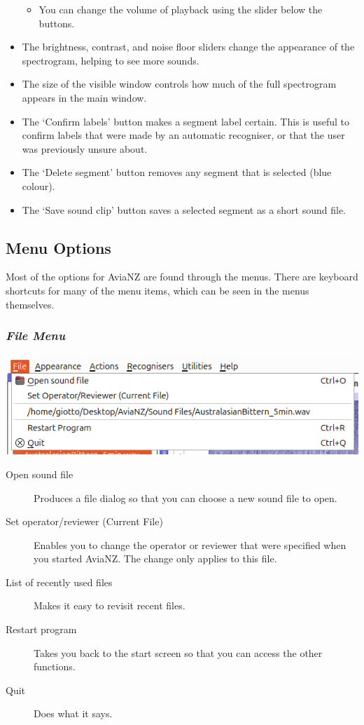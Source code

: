 \documentclass{article}
\begin{document}
\begin{itemize}
\begin{itemize}
\begin{itemize}
    \end{itemize}
\item You can change the volume of playback using the slider below the buttons. 
\end{itemize}

\item The brightness, contrast, and noise floor sliders change the appearance of the spectrogram, helping to see more sounds. 
\item The size of the visible window controls how much of the full spectrogram appears in the main window.
\item The `Confirm labels' button makes a segment label certain. This is useful to confirm labels that were made by an automatic recogniser, or that the user was previously unsure about.
\item The `Delete segment' button removes any segment that is selected (blue colour). 
\item The `Save sound clip' button saves a selected segment as a short sound file.
\end{itemize}

\subsection{Menu Options}	

Most of the options for AviaNZ are found through the menus. There are keyboard shortcuts for many of the menu items, which can be seen in the menus themselves. 

\subsubsection{{\em File Menu}}

\begin{center}
\includegraphics[width=.7\textwidth]{Figures/FileMenu}
\end{center}

\begin{description}
\item[Open sound file] Produces a file dialog so that you can choose a new sound file to open.
\item[Set operator/reviewer (Current File)] Enables you to change the operator or reviewer that were specified when you started AviaNZ. The change only applies to this file. 
\item[List of recently used files] Makes it easy to revisit recent files.
\item[Restart program] Takes you back to the start screen so that you can access the other functions.
\item[Quit] Does what it says.
\end{description}
\end{document}
